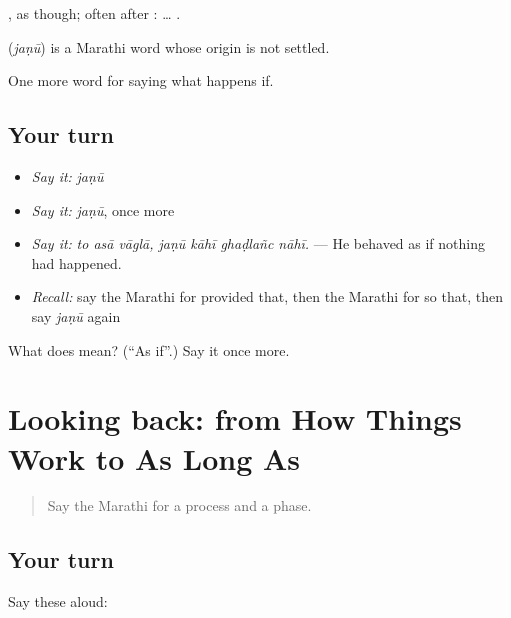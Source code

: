  , as though; often after :  … .

\begin{cousinweb}
\textbf{} (\emph{jaṇū}) is a Marathi word whose origin is not settled.
\end{cousinweb}

\begin{grammarlens}[title={What you've built}]
One more word for saying what happens if.
\end{grammarlens}

\subsection*{Your turn}
\begin{itemize}
\raggedright
  \item \emph{Say it:} \emph{jaṇū}
  \item \emph{Say it:} \emph{jaṇū}, once more
  \item \emph{Say it:} \emph{to asā vāglā, jaṇū kāhī ghaḍlañc nāhī.} — He behaved as if nothing had happened.
  \item \emph{Recall:} say the Marathi for provided that, then the Marathi for so that, then say \emph{jaṇū} again
\end{itemize}

\begin{tcolorbox}[breakable,colback=teal!4,colframe=teal!35!black,title={Before you move on}]
What does  mean? (\textquotedblleft{}As if\textquotedblright{}.) Say it once more.
\end{tcolorbox}
\section[(dialogue)]{Looking back: from How Things Work to As Long As}

\label{lesson:MR-R381-review-374-381}



\begin{quote}
Say the Marathi for a process and a phase.
\end{quote}

\subsection*{Your turn}
Say these aloud:

